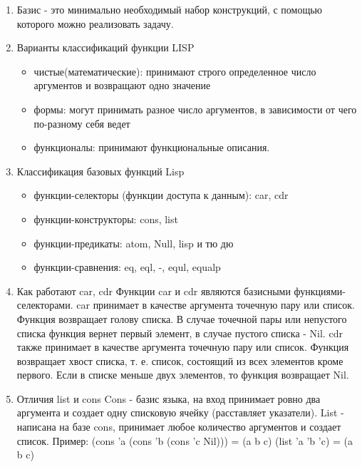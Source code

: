 \documentclass[a4paper,12pt]{article}
\begin{document}
	\begin{enumerate}
		\item Базис - это минимально необходимый набор конструкций, с помощью которого можно реализовать задачу.
		\item Варианты классификаций функции LISP
		\begin{itemize}
			\item чистые(математические): принимают строго определенное число аргументов и возвращают одно значение
			\item формы: могут принимать разное число аргументов, в зависимости от чего по-разному себя ведет
			\item функционалы: принимают функциональные описания.
		\end{itemize}
		\item Классификация базовых функций Lisp
		\begin{itemize}
			\item функции-селекторы (функции доступа к данным): car, cdr
			\item функции-конструкторы: cons, list
			\item функции-предикаты: atom, Null, lisp и тю дю
			\item функции-сравнения: eq, eql, -, equl, equalp
		\end{itemize}
		\item Как работают car, cdr
		Функции car и cdr являются базисными функциями-селекторами.
		car принимает в качестве аргумента точечную пару или список. Функция возвращает голову списка. В случае точечной пары или непустого списка функция вернет первый элемент, в случае пустого списка - Nil. cdr также принимает в качестве аргумента точечную пару или список. Функция возвращает хвост списка, т. е. список, состоящий из всех элементов кроме первого. Если в списке меньше двух элементов, то функция возвращает Nil.
		\item Отличия list и cons
		Cons - базис языка, на вход принимает ровно два аргумента и создает одну списковую ячейку (расставляет указатели).
		List - написана на базе cons, принимает любое количество аргументов и создает список.
		Пример:
		(cons 'a (cons 'b (cons 'c Nil))) = (a b c)
		(list 'a 'b 'c) = (a b c)
	\end{enumerate}

	
\end{document}
